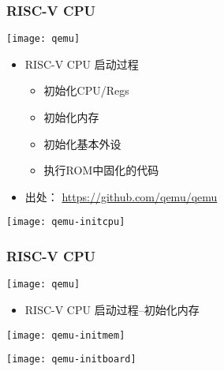 \begin{frame}
	\frametitle{RISC-V CPU}
	\centering
	\texttt{[image: qemu]}	
	\begin{itemize}
		
		\item RISC-V CPU 启动过程
		\begin{itemize}
			\item 初始化CPU/Regs	
			\item 初始化内存
			\item 初始化基本外设
			\item 执行ROM中固化的代码
		\end{itemize}
		\item 出处： \href{https://github.com/qemu/qemu}{https://github.com/qemu/qemu}
		
	\end{itemize}	
	
\end{frame}


\begin{frame}[plain]
%		
%		
	\centering
	\texttt{[image: qemu-initcpu]}
\end{frame}

\begin{frame}
	\frametitle{RISC-V CPU}
	\texttt{[image: qemu]}	
	\begin{itemize}
		
		\item RISC-V CPU 启动过程--初始化内存
		
	\end{itemize}	
	
	\centering
	\texttt{[image: qemu-initmem]}
\end{frame}

\begin{frame}[plain]
%		
%		
	\centering
	\texttt{[image: qemu-initboard]}
\end{frame}


